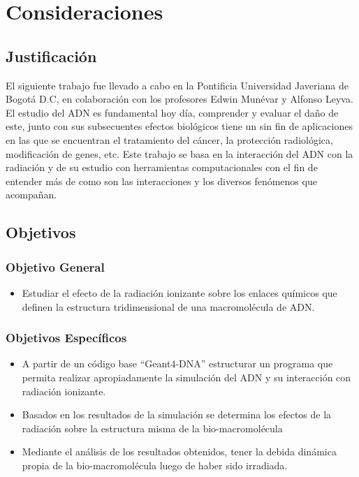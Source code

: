 \clearpage
\section{Consideraciones}

\subsection{Justificación}
\label{sec:Intro}
El siguiente trabajo fue llevado a cabo en la Pontificia Universidad Javeriana de Bogotá D.C, en colaboración con los profesores Edwin Munévar y Alfonso Leyva. El estudio del ADN es fundamental hoy día, comprender y evaluar el daño de este, junto con sus subsecuentes efectos biológicos tiene un sin fin de aplicaciones en las que se encuentran el tratamiento del cáncer, la protección radiológica, modificación de genes, etc. Este trabajo se basa en la interacción del ADN con la radiación y de su estudio con herramientas computacionales con el fin de entender más de como son las interacciones y los diversos fenómenos que acompañan.
\subsection{Objetivos}
\subsubsection{Objetivo General}
\begin{itemize}
  \item Estudiar el efecto de la radiación ionizante sobre los enlaces químicos que definen la estructura tridimensional de una macromolécula de ADN.
\end{itemize}
\subsubsection{Objetivos Específicos}
\begin{itemize}
  \item A partir de un código base “Geant4-DNA” estructurar un programa que permita realizar apropiadamente la simulación del ADN y su interacción con radiación ionizante.
  \item Basados en los resultados de la simulación se determina los efectos de la radiación sobre la estructura misma de la bio-macromolécula
  \item Mediante el análisis de los resultados obtenidos, tener la debida dinámica propia de la bio-macromolécula luego de haber sido irradiada.
\end{itemize}
